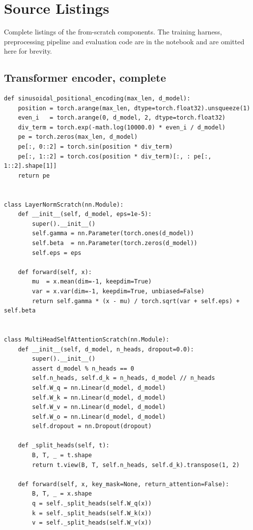 \chapter{Source Listings}
\label{app:source}

Complete listings of the from-scratch components. The training harness, preprocessing pipeline and
evaluation code are in the notebook and are omitted here for brevity.

\section{Transformer encoder, complete}

{\small
\begin{verbatim}
def sinusoidal_positional_encoding(max_len, d_model):
    position = torch.arange(max_len, dtype=torch.float32).unsqueeze(1)
    even_i   = torch.arange(0, d_model, 2, dtype=torch.float32)
    div_term = torch.exp(-math.log(10000.0) * even_i / d_model)
    pe = torch.zeros(max_len, d_model)
    pe[:, 0::2] = torch.sin(position * div_term)
    pe[:, 1::2] = torch.cos(position * div_term)[:, : pe[:, 1::2].shape[1]]
    return pe


class LayerNormScratch(nn.Module):
    def __init__(self, d_model, eps=1e-5):
        super().__init__()
        self.gamma = nn.Parameter(torch.ones(d_model))
        self.beta  = nn.Parameter(torch.zeros(d_model))
        self.eps = eps

    def forward(self, x):
        mu  = x.mean(dim=-1, keepdim=True)
        var = x.var(dim=-1, keepdim=True, unbiased=False)
        return self.gamma * (x - mu) / torch.sqrt(var + self.eps) + self.beta


class MultiHeadSelfAttentionScratch(nn.Module):
    def __init__(self, d_model, n_heads, dropout=0.0):
        super().__init__()
        assert d_model % n_heads == 0
        self.n_heads, self.d_k = n_heads, d_model // n_heads
        self.W_q = nn.Linear(d_model, d_model)
        self.W_k = nn.Linear(d_model, d_model)
        self.W_v = nn.Linear(d_model, d_model)
        self.W_o = nn.Linear(d_model, d_model)
        self.dropout = nn.Dropout(dropout)

    def _split_heads(self, t):
        B, T, _ = t.shape
        return t.view(B, T, self.n_heads, self.d_k).transpose(1, 2)

    def forward(self, x, key_mask=None, return_attention=False):
        B, T, _ = x.shape
        q = self._split_heads(self.W_q(x))
        k = self._split_heads(self.W_k(x))
        v = self._split_heads(self.W_v(x))


\end{verbatim}}
